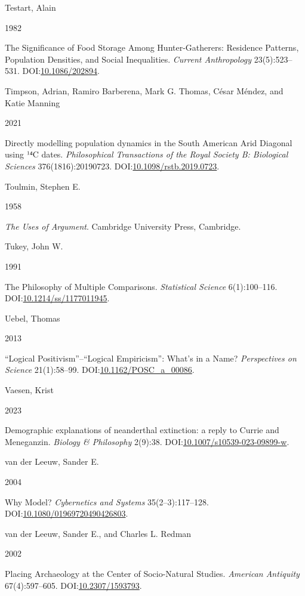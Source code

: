 \documentclass[
  12pt,
  a4paper,
  oneside]{book}
\newlength{\cslhangindent}
\newlength{\csllabelwidth}
\newlength{\cslentryspacingunit} %
\newenvironment{CSLReferences}[2] %
 {%
  \setlength{\parindent}{0pt}
  \ifodd #1
  \let\oldpar\par
  \def\par{\hangindent=\cslhangindent\oldpar}
  \fi
  \setlength{\parskip}{#2\cslentryspacingunit}
 }%
 {}
\newcommand{\CSLBlock}[1]{#1\hfill\break}
\newcommand{\CSLLeftMargin}[1]{\parbox[t]{\csllabelwidth}{#1}}
\newcommand{\CSLRightInline}[1]{\parbox[t]{\linewidth - \csllabelwidth}{#1}\break}
\begin{document}
\begin{CSLReferences}{0}{0}
\leavevmode{}%
\CSLBlock{Testart, Alain}
\CSLLeftMargin{ 1982}
\CSLRightInline{{The Significance of Food Storage Among Hunter-Gatherers: Residence Patterns, Population Densities, and Social Inequalities}. \emph{Current Anthropology} 23(5):523--531. DOI:\href{https://doi.org/10.1086/202894}{10.1086/202894}.}

\leavevmode{}%
\CSLBlock{Timpson, Adrian, Ramiro Barberena, Mark G. Thomas, César Méndez, and Katie Manning}
\CSLLeftMargin{ 2021}
\CSLRightInline{Directly modelling population dynamics in the South American Arid Diagonal using ¹⁴C dates. \emph{Philosophical Transactions of the Royal Society B: Biological Sciences} 376(1816):20190723. DOI:\href{https://doi.org/10.1098/rstb.2019.0723}{10.1098/rstb.2019.0723}.}

\leavevmode{}%
\CSLBlock{Toulmin, Stephen E.}
\CSLLeftMargin{ 1958}
\CSLRightInline{\emph{{The Uses of Argument}}. Cambridge University Press, Cambridge.}

\leavevmode{}%
\CSLBlock{Tukey, John W.}
\CSLLeftMargin{ 1991}
\CSLRightInline{{The Philosophy of Multiple Comparisons}. \emph{Statistical Science} 6(1):100--116. DOI:\href{https://doi.org/10.1214/ss/1177011945}{10.1214/ss/1177011945}.}

\leavevmode{}%
\CSLBlock{Uebel, Thomas}
\CSLLeftMargin{ 2013}
\CSLRightInline{{{``Logical Positivism''}--{``Logical Empiricism''}: What's in a Name?} \emph{Perspectives on Science} 21(1):58--99. DOI:\href{https://doi.org/10.1162/POSC_a_00086}{10.1162/POSC\_a\_00086}.}

\leavevmode{}%
\CSLBlock{Vaesen, Krist}
\CSLLeftMargin{ 2023}
\CSLRightInline{Demographic explanations of neanderthal extinction: a reply to Currie and Meneganzin. \emph{Biology \& Philosophy} 2(9):38. DOI:\href{https://doi.org/10.1007/s10539-023-09899-w}{10.1007/s10539-023-09899-w}.}

\leavevmode{}%
\CSLBlock{van der Leeuw, Sander E.}
\CSLLeftMargin{ 2004}
\CSLRightInline{{Why Model?} \emph{Cybernetics and Systems} 35(2--3):117--128. DOI:\href{https://doi.org/10.1080/01969720490426803}{10.1080/01969720490426803}.}

\leavevmode{}%
\CSLBlock{van der Leeuw, Sander E., and Charles L. Redman}
\CSLLeftMargin{ 2002}
\CSLRightInline{{Placing Archaeology at the Center of Socio-Natural Studies}. \emph{American Antiquity} 67(4):597--605. DOI:\href{https://doi.org/10.2307/1593793}{10.2307/1593793}.}


\end{CSLReferences}
\end{document}
